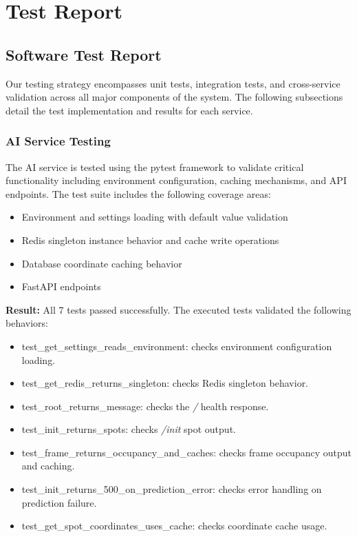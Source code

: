 \section{Test Report}
\label{section:test-report}

\subsection{Software Test Report}
\label{subsection:software-test-report}

Our testing strategy encompasses unit tests, integration tests, and cross-service validation across all major components of the system. The following subsections detail the test implementation and results for each service.

\subsubsection{AI Service Testing}

The AI service is tested using the pytest framework to validate critical functionality including environment configuration, caching mechanisms, and API endpoints. The test suite includes the following coverage areas:

\begin{itemize}
    \item Environment and settings loading with default value validation
    \item Redis singleton instance behavior and cache write operations
    \item Database coordinate caching behavior
    \item FastAPI endpoints
\end{itemize}

\noindent\textbf{Result:} All 7 tests passed successfully. The executed tests validated the following behaviors:
\begin{itemize}
    \item test\_get\_settings\_reads\_environment: checks environment configuration loading.
    \item test\_get\_redis\_returns\_singleton: checks Redis singleton behavior.
    \item test\_root\_returns\_message: checks the \textit{/} health response.
    \item test\_init\_returns\_spots: checks \textit{/init} spot output.
    \item test\_frame\_returns\_occupancy\_and\_caches: checks frame occupancy output and caching.
    \item test\_init\_returns\_500\_on\_prediction\_error: checks error handling on prediction failure.
    \item test\_get\_spot\_coordinates\_uses\_cache: checks coordinate cache usage.
\end{itemize}

